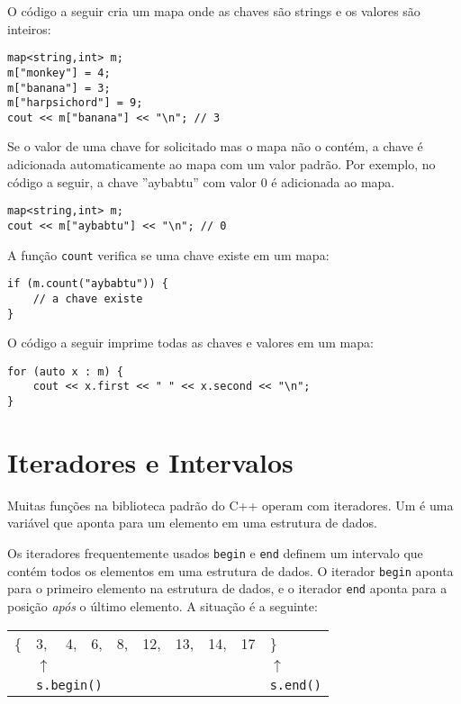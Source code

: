 O código a seguir cria um mapa
onde as chaves são strings e os valores são inteiros:

\begin{lstlisting}
map<string,int> m;
m["monkey"] = 4;
m["banana"] = 3;
m["harpsichord"] = 9;
cout << m["banana"] << "\n"; // 3
\end{lstlisting}

Se o valor de uma chave for solicitado
mas o mapa não o contém,
a chave é adicionada automaticamente ao mapa com
um valor padrão.
Por exemplo, no código a seguir,
a chave ''aybabtu'' com valor 0
é adicionada ao mapa.

\begin{lstlisting}
map<string,int> m;
cout << m["aybabtu"] << "\n"; // 0
\end{lstlisting}
A função \texttt{count} verifica
se uma chave existe em um mapa:
\begin{lstlisting}
if (m.count("aybabtu")) {
    // a chave existe
}
\end{lstlisting}
O código a seguir imprime todas as chaves e valores
em um mapa:
\begin{lstlisting}
for (auto x : m) {
    cout << x.first << " " << x.second << "\n";
}
\end{lstlisting}

\section{Iteradores e Intervalos}


Muitas funções na biblioteca padrão do C++
operam com iteradores.
Um  é uma variável que aponta
para um elemento em uma estrutura de dados.

Os iteradores frequentemente usados \texttt{begin}
e \texttt{end} definem um intervalo que contém
todos os elementos em uma estrutura de dados.
O iterador \texttt{begin} aponta para
o primeiro elemento na estrutura de dados,
e o iterador \texttt{end} aponta para
a posição \emph{após} o último elemento.
A situação é a seguinte:

\begin{center}
\begin{tabular}{llllllllll}
\{ & 3, & 4, & 6, & 8, & 12, & 13, & 14, & 17 & \} \\
& $\uparrow$ & & & & & & & & $\uparrow$ \\
& \multicolumn{3}{l}{\texttt{s.begin()}} & & & & & & \texttt{s.end()} \\
\end{tabular}
\end{center}


